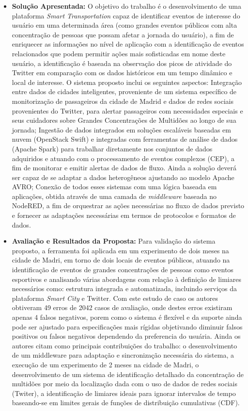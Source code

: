 \documentclass[tid,table]{texufpel} %
\begin{document}
\begin{itemize}
	\item \textbf{Solução Apresentada:} O objetivo do trabalho é o desenvolvimento de uma plataforma \textit{Smart Transportation} capaz de identificar eventos de interesse do usuário em uma determinada área (como grandes eventos públicos com alta concentração de pessoas que possam afetar a jornada do usuário), a fim de enriquecer as informações no nível de aplicação com a identificação de eventos relacionados que podem permitir ações mais sofisticadas em nome deste usuário, a identificação é baseada na observação dos picos de atividade do Twitter em comparação com os dados históricos em um tempo dinâmico e local de interesse. O sistema proposto inclui os seguintes aspectos: Integração entre dados de cidades inteligentes, proveniente de um sistema específico de monitorização de passageiros da cidade de Madrid e dados de redes sociais provenientes do Twitter, para alertar passageiros com necessidades especiais e seus cuidadores sobre Grandes Concentrações de Multidões ao longo de sua jornada; Ingestão de dados integrados em soluções escaláveis baseadas em nuvem (OpenStack Swift) e integradas com ferramentas de análise de dados (Apache Spark) para trabalhar diretamente nos conjuntos de dados adquiridos e atuando com o processamento de eventos complexos (CEP), a fim de monitorar e emitir alertas de dados de fluxo. Ainda a solução deverá ser capaz de se adaptar a dados heterogêneos ajustando ao modelo Apache AVRO; Conexão de todos esses sistemas com uma lógica baseada em aplicações, obtida através de uma camada de \textit{middleware} baseada no NodeRED, a fim de orquestrar as ações necessárias no fluxo de dados previsto e fornecer as adaptações necessárias em termos de protocolos e formatos de dados.	
	
	\item \textbf{Avaliação e Resultados da Proposta:} Para validação do sistema proposto, a ferramenta foi aplicada em um experimento de dois meses na cidade de Madri, em torno de dois locais de eventos públicos, atuando na identificação de eventos de grandes concentrações de pessoas como eventos esportivos e analisando várias abordagens com relação à definição de limiares necessários como: estrutura integrada e automatizada, incluindo serviços da plataforma \textit{Smart City} e Twitter. Com este estudo de caso os autores obtiveram 49 erros de 2042 casos de avaliação, onde destes erros existiram apenas 4 falsos negativos, porem como o sistema é flexível e da suporte ainda pode ser ajustado para especificações mais rígidas objetivando diminuir falsos positivos ou falsos negativos dependendo da preferencia do usuária.
	Ainda os autores citam como principais contribuições do trabalho: o desenvolvimento de um middleware para adaptação e sincronização necessária do sistema, a execução de um experimento de 2 meses na cidade de Madri, o desenvolvimento de um sistema de identificação detalhado da concentração  de multidões por meio da localização dada com o uso de dados de redes sociais (Twiter), a identificação de limiares ideais para ignorar intervalos de tempo baseando-se em limites gerais de funções de distribuição cumulativas (CDF).
\end{itemize}
\end{document}
